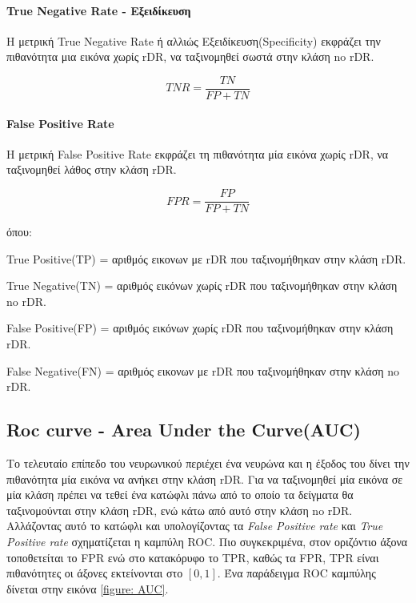 \paragraph{True Negative Rate - Εξειδίκευση}

Η μετρική  True Negative Rate ή αλλιώς Εξειδίκευση(Specificity) εκφράζει την πιθανότητα μια εικόνα χωρίς rDR, να ταξινομηθεί σωστά στην κλάση no rDR. 

\begin{equation} \label{eq:6.11}
TNR = \frac{TN}{FP + TN}
\end{equation}


\paragraph{False Positive Rate}
Η μετρική  False Positive Rate εκφράζει τη πιθανότητα μία εικόνα χωρίς rDR, να ταξινομηθεί λάθος στην κλάση rDR. 


\begin{equation} \label{eq:6.10}
FPR = \frac{FP}{FP + TN}
\end{equation}



\par
όπου:

True Positive(TP) = αριθμός εικονων με rDR που ταξινομήθηκαν στην κλάση rDR.

True Negative(TN) = αριθμός εικόνων χωρίς rDR που ταξινομήθηκαν στην κλάση no rDR.

False Positive(FP) = αριθμός εικόνων χωρίς rDR που ταξινομήθηκαν στην κλάση rDR.

False Negative(FN) =  αριθμός εικονων με rDR που ταξινομήθηκαν στην κλάση no rDR.



\subsection{Roc curve - Area Under the Curve(AUC)}
\label{subsec:6.2.2}
Το τελευταίο επίπεδο του νευρωνικού  περιέχει ένα νευρώνα και η έξοδος του δίνει την πιθανότητα μία εικόνα να ανήκει στην κλάση rDR. Για να ταξινομηθεί μία εικόνα σε μία κλάση πρέπει να τεθεί ένα κατώφλι πάνω από το οποίο τα δείγματα θα ταξινομούνται στην κλάση rDR, ενώ κάτω από αυτό στην κλάση no rDR. Αλλάζοντας αυτό το κατώφλι και υπολογίζοντας τα \textit{False Positive rate}  και  \textit{True Positive rate} σχηματίζεται η καμπύλη ROC. Πιο συγκεκριμένα, στον οριζόντιο άξονα τοποθετείται το FPR ενώ στο κατακόρυφο το TPR, καθώς τα FPR, TPR είναι πιθανότητες οι άξονες εκτείνονται στο $[0,1]$. Ένα παράδειγμα ROC καμπύλης δίνεται στην εικόνα \ref{figure: AUC}. 

